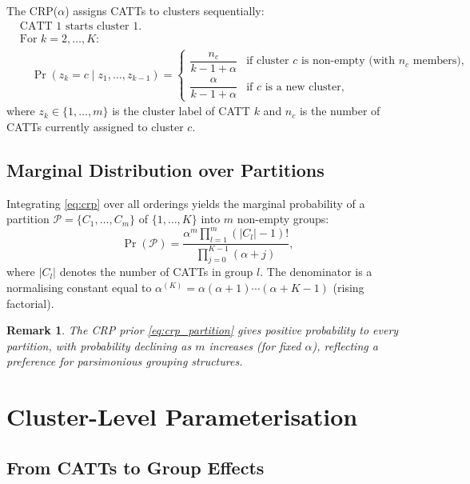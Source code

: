 \documentclass[12pt]{article}
\newtheorem{remark}{Remark}
\newcommand{\1}{\mathbbm{1}}
\begin{document}
The CRP($\alpha$) assigns CATTs to clusters sequentially:
\begin{align}
  &\text{CATT 1 starts cluster 1.}\nonumber\\
  &\text{For }k = 2,\ldots,K:\nonumber\\
  &\quad \Pr(z_k = c \mid z_1,\ldots,z_{k-1}) =
    \begin{cases}
      \dfrac{n_c}{k-1+\alpha} & \text{if cluster }c\text{ is non-empty (with }n_c\text{ members)},\\[6pt]
      \dfrac{\alpha}{k-1+\alpha} & \text{if }c\text{ is a new cluster},
    \end{cases}
  \label{eq:crp}
\end{align}
where $z_k\in\{1,\ldots,m\}$ is the cluster label of CATT $k$ and $n_c$ is
the number of CATTs currently assigned to cluster $c$.

\subsection{Marginal Distribution over Partitions}

Integrating \eqref{eq:crp} over all orderings yields the marginal probability
of a partition $\mathcal{P} = \{C_1,\ldots,C_m\}$ of $\{1,\ldots,K\}$ into
$m$ non-empty groups:
\begin{equation}
  \Pr(\mathcal{P}) = \frac{\alpha^m \prod_{l=1}^{m}(|C_l|-1)!}{\prod_{j=0}^{K-1}(\alpha+j)},
  \label{eq:crp_partition}
\end{equation}
where $|C_l|$ denotes the number of CATTs in group $l$. The denominator is a
normalising constant equal to $\alpha^{(K)} = \alpha(\alpha+1)\cdots(\alpha+K-1)$
(rising factorial).

\begin{remark}
  The CRP prior \eqref{eq:crp_partition} gives positive probability to every
  partition, with probability declining as $m$ increases (for fixed $\alpha$),
  reflecting a preference for parsimonious grouping structures.
\end{remark}

\section{Cluster-Level Parameterisation}

\subsection{From CATTs to Group Effects}
\end{document}
